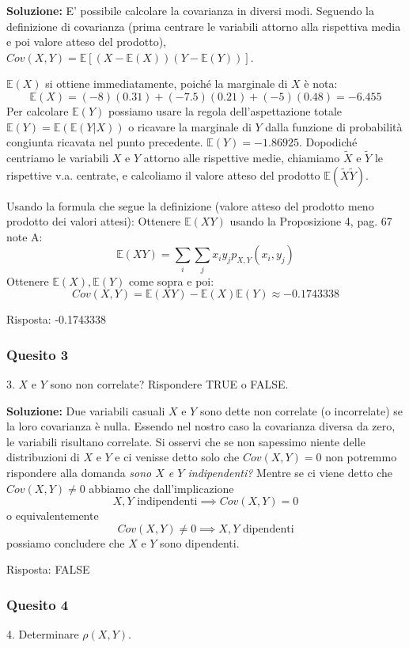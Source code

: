 \documentclass[12pt, a4paper]{article}
\begin{document}
\textbf{Soluzione:}
E’ possibile calcolare la covarianza in diversi modi.
Seguendo la definizione di covarianza (prima centrare le variabili attorno alla rispettiva media e poi valore atteso del prodotto), $Cov(X,Y) = \mathbb{E}[(X-\mathbb{E}(X))(Y-\mathbb{E}(Y))]$.

$\mathbb{E}(X)$ si ottiene immediatamente, poiché la marginale di $X$ è nota:
$$ \mathbb{E}(X) = (-8)(0.31) + (-7.5)(0.21) + (-5)(0.48) = -6.455 $$
Per calcolare $\mathbb{E}(Y)$ possiamo usare la regola dell’aspettazione totale $\mathbb{E}(Y) = \mathbb{E}(\mathbb{E}(Y|X))$ o ricavare la marginale di $Y$ dalla funzione di probabilità congiunta ricavata nel punto precedente. $\mathbb{E}(Y) = -1.86925$.
Dopodiché centriamo le variabili $X$ e $Y$ attorno alle rispettive medie, chiamiamo $\tilde{X}$ e $\tilde{Y}$ le rispettive v.a. centrate, e calcoliamo il valore atteso del prodotto $\mathbb{E}(\tilde{X}\tilde{Y})$.

Usando la formula che segue la definizione (valore atteso del prodotto meno prodotto dei valori attesi):
Ottenere $\mathbb{E}(XY)$ usando la Proposizione 4, pag. 67 note A:
$$ \mathbb{E}(XY) = \sum_i \sum_j x_i y_j p_{X,Y}(x_i, y_j) $$
Ottenere $\mathbb{E}(X), \mathbb{E}(Y)$ come sopra e poi:
$$ Cov(X,Y) = \mathbb{E}(XY) - \mathbb{E}(X)\mathbb{E}(Y) \approx -0.1743338 $$

Risposta: -0.1743338

\subsubsection*{Quesito 3}
3. $X$ e $Y$ sono non correlate? Rispondere TRUE o FALSE.

\textbf{Soluzione:}
Due variabili casuali $X$ e $Y$ sono dette non correlate (o incorrelate) se la loro covarianza è nulla. Essendo nel nostro caso la covarianza diversa da zero, le variabili risultano correlate.
Si osservi che se non sapessimo niente delle distribuzioni di $X$ e $Y$ e ci venisse detto solo che $Cov(X,Y)=0$ non potremmo rispondere alla domanda \textit{sono $X$ e $Y$ indipendenti?}
Mentre se ci viene detto che $Cov(X,Y) \neq 0$ abbiamo che dall’implicazione 
$$ X,Y \text{ indipendenti} \implies Cov(X,Y)=0 $$
o equivalentemente 
$$ Cov(X,Y) \neq 0 \implies X,Y \text{ dipendenti} $$
possiamo concludere che $X$ e $Y$ sono dipendenti.

Risposta: FALSE

\newpage

\subsubsection*{Quesito 4}
4. Determinare $\rho(X,Y)$.
\end{document}
